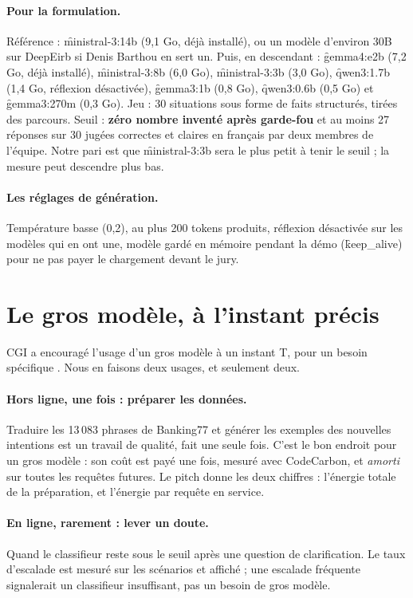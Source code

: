 \paragraph{Pour la formulation.} Référence : \f{ministral-3:14b} (9,1 Go, déjà installé), ou un
modèle d'environ 30B sur DeepEirb si Denis Barthou en sert un. Puis, en descendant :
\f{gemma4:e2b} (7,2 Go, déjà installé), \f{ministral-3:8b} (6,0 Go), \f{ministral-3:3b}
(3,0 Go), \f{qwen3:1.7b} (1,4 Go, réflexion désactivée), \f{gemma3:1b} (0,8 Go),
\f{qwen3:0.6b} (0,5 Go) et \f{gemma3:270m} (0,3 Go). Jeu : 30 situations sous forme de faits structurés, tirées des parcours. Seuil :
\textbf{zéro nombre inventé après garde-fou} et au moins 27 réponses sur 30 jugées correctes et
claires en français par deux membres de l'équipe. Notre pari est que \f{ministral-3:3b} sera le plus
petit à tenir le seuil ; la mesure peut descendre plus bas.

\paragraph{Les réglages de génération.} Température basse (0,2), au plus 200 tokens produits,
réflexion désactivée sur les modèles qui en ont une, modèle gardé en mémoire pendant la démo
(\f{keep\_alive}) pour ne pas payer le chargement devant le jury.

\section{Le gros modèle, à l'instant précis}

CGI a encouragé l'usage d'un gros modèle \og à un instant T, pour un besoin spécifique \fg. Nous en
faisons deux usages, et seulement deux.

\paragraph{Hors ligne, une fois : préparer les données.} Traduire les 13\,083 phrases de Banking77
et générer les exemples des nouvelles intentions est un travail de qualité, fait une seule fois.
C'est le bon endroit pour un gros modèle : son coût est payé une fois, mesuré avec CodeCarbon, et
\emph{amorti} sur toutes les requêtes futures. Le pitch donne les deux chiffres : l'énergie totale
de la préparation, et l'énergie par requête en service.

\paragraph{En ligne, rarement : lever un doute.} Quand le classifieur reste sous le seuil après une
question de clarification. Le taux d'escalade est mesuré sur les scénarios et affiché ; une
escalade fréquente signalerait un classifieur insuffisant, pas un besoin de gros modèle.

